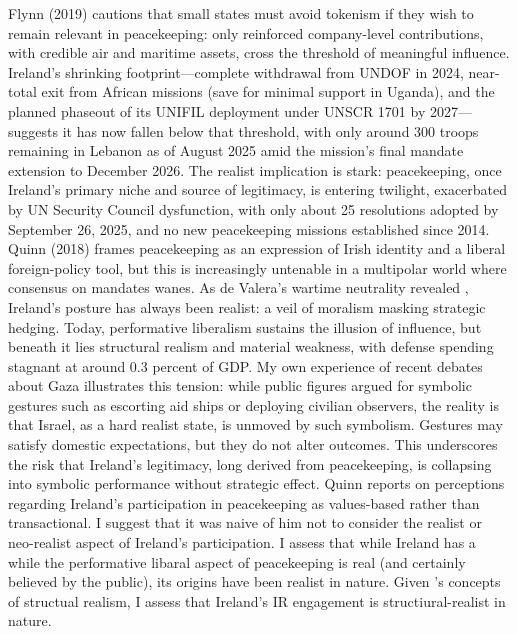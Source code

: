 Flynn (2019)\nocite{FLYNN_2019} cautions that small states must avoid tokenism if they wish to remain relevant in peacekeeping: only reinforced company-level contributions, with credible air and maritime assets, cross the threshold of meaningful influence. Ireland’s shrinking footprint—complete withdrawal from UNDOF in 2024, near-total exit from African missions (save for minimal support in Uganda), and the planned phaseout of its UNIFIL deployment under UNSCR 1701 by 2027—suggests it has now fallen below that threshold, with only around 300 troops remaining in Lebanon as of August 2025 amid the mission's final mandate extension to December 2026. The realist implication is stark: peacekeeping, once Ireland’s primary niche and source of legitimacy, is entering twilight, exacerbated by UN Security Council dysfunction, with only about 25 resolutions adopted by September 26, 2025, and no new peacekeeping missions established since 2014. \nocite{QUINN_2018} Quinn (2018) frames peacekeeping as an expression of Irish identity and a liberal foreign-policy tool, but this is increasingly untenable in a multipolar world where consensus on mandates wanes. As de Valera’s wartime neutrality revealed \parencite{FANNING_2015,AYIOTIS_2023}, Ireland’s posture has always been realist: a veil of moralism masking strategic hedging. Today, performative liberalism sustains the illusion of influence, but beneath it lies structural realism and material weakness, with defense spending stagnant at around 0.3 percent of GDP. My own experience of recent debates about Gaza illustrates this tension: while public figures argued for symbolic gestures such as escorting aid ships or deploying civilian observers, the reality is that Israel, as a hard realist state, is unmoved by such symbolism. Gestures may satisfy domestic expectations, but they do not alter outcomes. This underscores the risk that Ireland’s legitimacy, long derived from peacekeeping, is collapsing into symbolic performance without strategic effect. Quinn \nocite{QUINN_2018} reports on perceptions regarding Ireland's participation in peacekeeping as values-based rather than transactional. I suggest that it was naive of him not to consider the realist or neo-realist aspect of Ireland's participation. I assess that while Ireland has a while the performative libaral aspect of peacekeeping is real (and certainly believed by the public), its origins have been realist in nature. Given \parencite{WALTZ_1979}'s concepts of structual realism, I assess that Ireland's IR engagement is structiural-realist in nature. 

